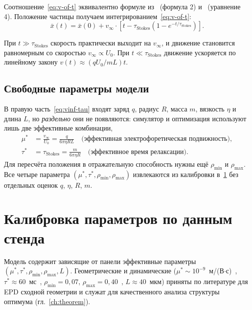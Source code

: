 Соотношение~\eqref{eq:v-of-t} эквивалентно формуле
из~\cite{wang2022_red_ghost} (формула 2) и~\cite{he2020_particle_activation}
(уравнение 4). Положение частицы получаем интегрированием~\eqref{eq:v-of-t}:
\begin{equation}\label{eq:x-of-t}
    \bar{x}(t) = \bar{x}(0)
    + v_\infty \cdot \left[ t - \tau_{\mathrm{Stokes}} (1 - e^{-t/\tau_{\mathrm{Stokes}}}) \right].
\end{equation}

При $t \gg \tau_{\mathrm{Stokes}}$ скорость практически выходит на
$v_\infty$, и движение становится равномерным со скоростью
$v_\infty \propto U_0$. При $t \ll \tau_{\mathrm{Stokes}}$ движение
ускоряется по линейному закону $v(t) \approx (qU_0/mL) t$.

\subsection*{Свободные параметры модели}

В правую часть~\eqref{eq:vinf-tau} входят заряд $q$, радиус $R$, масса $m$,
вязкость $\eta$ и длина $L$, но \emph{раздельно} они не появляются: симулятор и
оптимизация используют лишь две эффективные комбинации,
\begin{align}
    \mu^*  &= \frac{v_\infty}{U_0} = \frac{q}{6\pi\eta RL}
              \quad \text{(эффективная электрофоретическая подвижность)},
              \label{eq:mu-star} \\
    \tau^* &= \tau_{\mathrm{Stokes}} = \frac{m}{6\pi\eta R}
              \quad \text{(эффективное время релаксации)}.
              \label{eq:tau-star}
\end{align}
Для пересчёта положения в отражательную способность нужны ещё $\rho_{\min}$ и
$\rho_{\max}$. Все четыре параметра $(\mu^*, \tau^*, \rho_{\min}, \rho_{\max})$
извлекаются из калибровки в~\ref{sec:model-calibration} без отдельных оценок
$q$, $\eta$, $R$, $m$.


\section{Калибровка параметров по данным стенда}\label{sec:model-calibration}

Модель содержит зависящие от панели эффективные параметры
$(\mu^*, \tau^*, \rho_{\min}, \rho_{\max}, L)$. Геометрические и динамические
($\mu^*\sim10^{-9}$~м/(В$\cdot$с)~\cite{wang2022_red_ghost},
$\tau^*\approx60$~мс~\cite{he2020_particle_activation},
$\rho_{\min}=0{,}07$, $\rho_{\max}=0{,}40$~\cite{yang2021_mechanisms},
$L\approx40$~мкм) приняты по литературе для EPD сходной геометрии и служат для
качественного анализа структуры оптимума (гл.~\ref{ch:theorem}).

